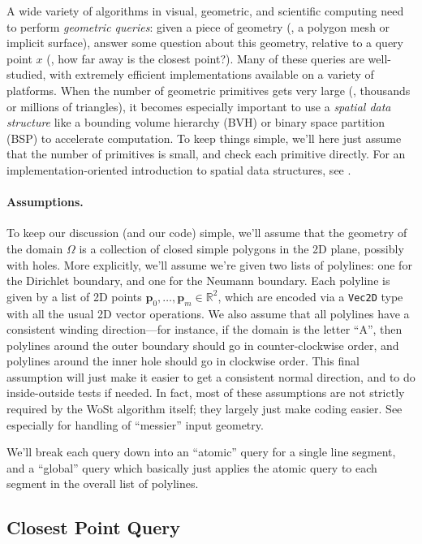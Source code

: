 \documentclass{article}
\newcommand{\code}[1]{\texttt{#1}}
\renewcommand{\vec}[1]{\textbf{#1}}
\begin{document}
A wide variety of algorithms in visual, geometric, and scientific computing need to perform \emph{geometric queries}: given a piece of geometry (\eg{}, a polygon mesh or implicit surface), answer some question about this geometry, relative to a query point \(x\) (\eg{}, how far away is the closest point?).  Many of these queries are well-studied, with extremely efficient implementations available on a variety of platforms.  When the number of geometric primitives gets very large (\eg{}, thousands or millions of triangles), it becomes especially important to use a \emph{spatial data structure} like a bounding volume hierarchy (BVH) or binary space partition (BSP) to accelerate computation.  To keep things simple, we'll here just assume that the number of primitives is small, and check each primitive directly.  For an implementation-oriented introduction to spatial data structures, see \citet[Section 4.2]{pharr2016physically}.

\paragraph{Assumptions.} To keep our discussion (and our code) simple, we'll assume that the geometry of the domain \(\Omega\) is a collection of closed simple polygons in the 2D plane, possibly with holes.  More explicitly, we'll assume we're given two lists of polylines: one for the Dirichlet boundary, and one for the Neumann boundary.  Each polyline is given by a list of 2D points \(\vec{p}_0, \ldots, \vec{p}_m \in \mathbb{R}^2\), which are encoded via a \code{Vec2D} type with all the usual 2D vector operations.  We also assume that all polylines have a consistent winding direction---for instance, if the domain is the letter ``A'', then polylines around the outer boundary should go in counter-clockwise order, and polylines around the inner hole should go in clockwise order.  This final assumption will just make it easier to get a consistent normal direction, and to do inside-outside tests if needed.  In fact, most of these assumptions are not strictly required by the WoSt algorithm itself; they largely just make coding easier.  See especially \citet[Appendix B]{Sawhney:2023:WoSt} for handling of ``messier'' input geometry.

We'll break each query down into an ``atomic'' query for a single line segment, and a ``global'' query which basically just applies the atomic query to each segment in the overall list of polylines.

\subsection{Closest Point Query}
\label{sec:ClosestPointQuery}
\end{document}
